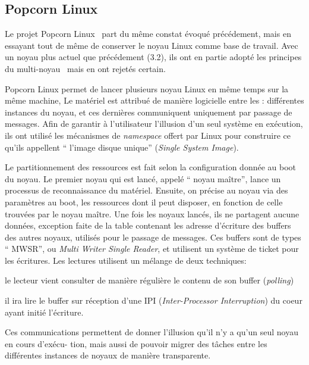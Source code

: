      
    \subsection{Popcorn Linux}

      Le projet Popcorn Linux~\citep{barbalacepopcorn} part du même constat évoqué précédement, mais
      en essayant tout de même de conserver le noyau Linux comme base de
      travail. Avec un noyau plus actuel que précédement (3.2), ils ont en
      partie adopté les principes du multi-noyau~\citep{} mais en ont rejetés certain.

      Popcorn Linux permet de lancer plusieurs noyau Linux en même temps sur la
      même machine, Le matériel est attribué de manière logicielle entre les :
      différentes instances du noyau, et ces dernières communiquent uniquement
      par passage de messages. Afin de garantir à l’utilisateur l’illusion d’un
      seul système en exécution, ils ont utilisé les mécanismes de \textit{namespace}
      offert par Linux pour construire ce qu’ils appellent `` l’image disque
      unique'' (\textit{Single System Image}).

      Le partitionnement des ressources est fait selon la configuration donnée
      au boot du noyau. Le premier noyau qui est lancé, appelé `` noyau
      maître'', lance un processus de reconnaissance du matériel. Ensuite, on
      précise au noyau via des paramètres au boot, les ressources dont il peut
      disposer, en fonction de celle trouvées par le noyau maître. Une fois les
      noyaux lancés, ils ne partagent aucune données, exception faite de la
      table contenant les adresse d’écriture des buffers des autres noyaux,
      utilisés pour le passage de messages. Ces buffers sont de types `` MWSR'',
      ou \textit{Multi Writer Single Reader}, et utilisent un système de ticket
      pour les écritures. Les lectures utilisent un mélange de deux
      techniques:\benumline \item le lecteur vient consulter de manière
      régulière le contenu de son buffer (\textit{polling}) \item il ira lire le
      buffer sur réception d’une IPI (\textit{Inter-Processor Interruption}) du
      coeur ayant initié l’écriture\eenumline.

      Ces communications permettent de donner l’illusion qu’il n’y a qu’un seul
      noyau en cours d’exécu- tion, mais aussi de pouvoir migrer des tâches
      entre les différentes instances de noyaux de manière transparente.

